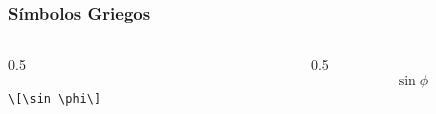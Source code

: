 \documentclass[12pt,aspectratio=169,ignorenonframetext]{ltxbeamer}
\begin{document}
\begin{frame}[fragile]
\frametitle{Símbolos Griegos}

\begin{columns}
    \begin{column}{0.5\textwidth}
        \begin{verbatim}
\[\sin \phi\]
        \end{verbatim}
    \end{column}
    {\color{gray} \vline}
    \begin{column}{0.5\textwidth}
        \[\sin \phi\]
    \end{column}
\end{columns}
\end{frame}
\end{document}
